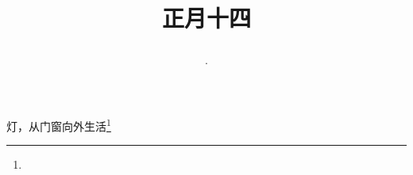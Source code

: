 \title{\date[d=23,m=2,y=2024][year:cn-y,年,month:cn,day:cn,日,·,weekday]·正月十四 }
灯，从门窗向外生活\footnote{ }


